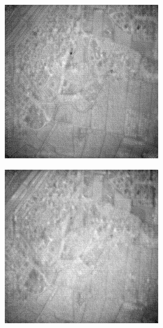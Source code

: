 \documentclass[10pt,twocolumn,letterpaper]{article}
\begin{document}
\begin{figure}[!ht]
\begin{subfigure}[b]{0.19\textwidth}
      \label{fig:cycleGan}
  \end{subfigure}
  \hfill
  \begin{subfigure}[b]{0.19\textwidth}
      \centering
      \includegraphics[width=\textwidth]{../figs/outputs/cut/7.png}
      \label{fig:cut}
  \end{subfigure}
  \hfill
  \begin{subfigure}[b]{0.19\textwidth}
      \centering
      \includegraphics[width=\textwidth]{../figs/outputs/petit/7.png}

\end{subfigure}
\end{figure}
\end{document}
